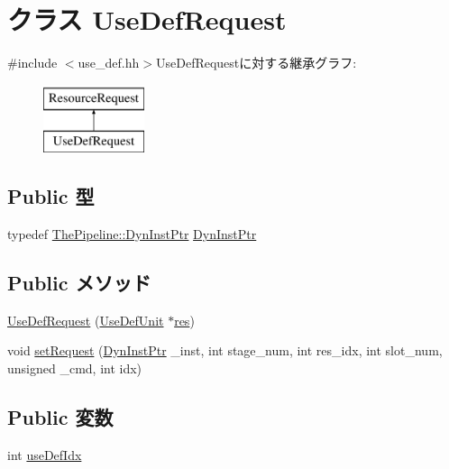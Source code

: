 \hypertarget{classUseDefUnit_1_1UseDefRequest}{
\section{クラス UseDefRequest}
\label{classUseDefUnit_1_1UseDefRequest}
}


{\ttfamily \#include $<$use\_\-def.hh$>$}UseDefRequestに対する継承グラフ:\begin{figure}[H]
\begin{center}
\leavevmode
\includegraphics[height=2cm]{classUseDefUnit_1_1UseDefRequest}
\end{center}
\end{figure}
\subsection*{Public 型}
\begin{DoxyCompactItemize}
\item 
typedef \hyperlink{classRefCountingPtr}{ThePipeline::DynInstPtr} \hyperlink{classUseDefUnit_1_1UseDefRequest_af9d0c8a46736ba6aa2d8bb94da1a5e73}{DynInstPtr}
\end{DoxyCompactItemize}
\subsection*{Public メソッド}
\begin{DoxyCompactItemize}
\item 
\hyperlink{classUseDefUnit_1_1UseDefRequest_a7d151741b3f8f4f6dc722cbb62f6b170}{UseDefRequest} (\hyperlink{classUseDefUnit}{UseDefUnit} $\ast$\hyperlink{classResourceRequest_ae6cb01f81685fa77e8716cdef5924b8a}{res})
\item 
void \hyperlink{classUseDefUnit_1_1UseDefRequest_ad26d470fa8b93d0d167abad9c5ca8e34}{setRequest} (\hyperlink{classRefCountingPtr}{DynInstPtr} \_\-inst, int stage\_\-num, int res\_\-idx, int slot\_\-num, unsigned \_\-cmd, int idx)
\end{DoxyCompactItemize}
\subsection*{Public 変数}
\begin{DoxyCompactItemize}
\item 
int \hyperlink{classUseDefUnit_1_1UseDefRequest_a914fa352bad59c48972e8d71f40fc898}{useDefIdx}
\end{DoxyCompactItemize}


